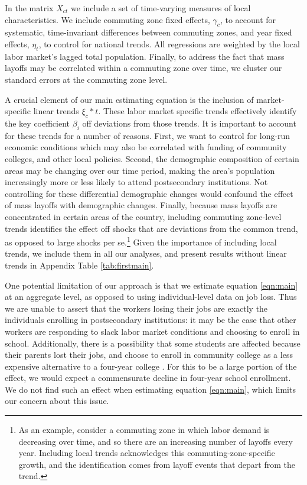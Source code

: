 In the matrix $X_{ct}$ we include a set of time-varying measures of local characteristics. We include commuting zone fixed effects, $\gamma_c$, to account for systematic, time-invariant differences between commuting zones, and  year fixed effects, $\eta_t$, to control for national trends.  All regressions are weighted by the local labor market's lagged total population. Finally, to address the fact that mass layoffs may be correlated within a commuting zone over time, we cluster our standard errors at the commuting zone level.

A crucial element of our main estimating equation is the inclusion of market-specific linear trends $\xi_c*t$. These labor market specific trends  effectively identify the key coefficient $\beta_i$ off deviations from those trends. It is important to account for these trends for a number of reasons. First, we want to control for long-run economic conditions which may also be correlated with funding of community colleges, and other local policies. Second, the demographic composition of certain areas may be changing  over our time period, making the area's population increasingly more or less likely to attend postsecondary institutions. Not controlling for these differential demographic changes would  confound the effect of mass layoffs with demographic changes. Finally, because mass layoffs are concentrated in certain areas of the country, including commuting zone-level trends  identifies the effect off shocks that are deviations from the common trend, as opposed to large shocks per se.\footnote{As an example, consider a commuting zone in which labor demand is decreasing over time, and so there are an increasing number of layoffs every year. Including local trends acknowledges this commuting-zone-specific growth, and the identification comes from layoff events that depart from the trend.}  Given the importance of including local trends, we include them in all our analyses, and present results without linear trends in Appendix Table \ref{tab:firstmain}.

One potential limitation of our approach is that we estimate equation \ref{eqn:main} at an aggregate level, as opposed to using individual-level data on job loss. Thus we are unable to assert that the workers losing their jobs are exactly the individuals enrolling in postsecondary institutions: it may be the case that other workers are responding to slack labor market conditions and choosing to enroll in school. Additionally, there is a possibility that some students are affected because their parents lost their jobs, and choose to enroll in community college as a less expensive alternative to a four-year college \citep{hilger2014}. For this to be a large portion of the effect, we would expect a commensurate decline in four-year school enrollment. We do not find such an effect when estimating equation \ref{eqn:main}, which limits our concern about this issue.

